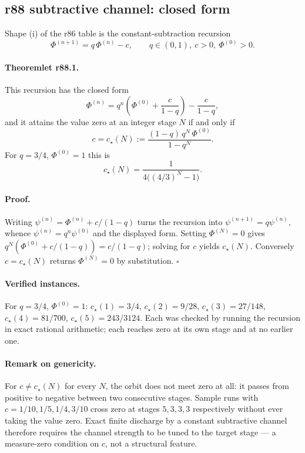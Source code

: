\subsection*{r88 subtractive channel: closed form}
\label{subsec:r88-subtractive-closed-form}

Shape (i) of the r86 table is the constant-subtraction recursion
\[
\Phi^{(n+1)}=q\,\Phi^{(n)}-c,
\qquad q\in(0,1),\ c>0,\ \Phi^{(0)}>0 .
\]

\paragraph{Theoremlet r88.1.}
This recursion has the closed form
\[
\Phi^{(n)}
=q^{n}\!\left(\Phi^{(0)}+\frac{c}{1-q}\right)-\frac{c}{1-q},
\]
and it attains the value zero at an integer stage \(N\) if and only if
\[
c=c_\star(N):=\frac{(1-q)\,q^{N}\,\Phi^{(0)}}{1-q^{N}} .
\]
For \(q=3/4\), \(\Phi^{(0)}=1\) this is
\[
c_\star(N)=\frac{1}{4\bigl((4/3)^{N}-1\bigr)} .
\]

\paragraph{Proof.}
Writing \(\psi^{(n)}=\Phi^{(n)}+c/(1-q)\) turns the recursion into
\(\psi^{(n+1)}=q\psi^{(n)}\), whence \(\psi^{(n)}=q^n\psi^{(0)}\) and the displayed form.
Setting \(\Phi^{(N)}=0\) gives \(q^{N}(\Phi^{(0)}+c/(1-q))=c/(1-q)\); solving for \(c\)
yields \(c_\star(N)\).  Conversely \(c=c_\star(N)\) returns \(\Phi^{(N)}=0\) by substitution.
\(\square\)

\paragraph{Verified instances.}
For \(q=3/4\), \(\Phi^{(0)}=1\): \(c_\star(1)=3/4\), \(c_\star(2)=9/28\),
\(c_\star(3)=27/148\), \(c_\star(4)=81/700\), \(c_\star(5)=243/3124\).  Each was checked by
running the recursion in exact rational arithmetic; each reaches zero at its own stage and at
no earlier one.

\paragraph{Remark on genericity.}
For \(c\ne c_\star(N)\) for every \(N\), the orbit does not meet zero at all: it passes from
positive to negative between two consecutive stages.  Sample runs with
\(c=1/10,1/5,1/4,3/10\) cross zero at stages \(5,3,3,3\) respectively without ever taking the
value zero.  Exact finite discharge by a constant subtractive channel therefore requires the
channel strength to be tuned to the target stage --- a measure-zero condition on \(c\), not a
structural feature.

